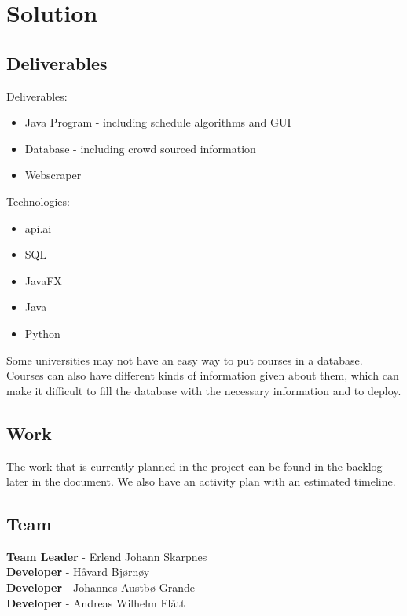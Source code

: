 \documentclass[pdftex, 12pt, norsk, a4paper, twoside]{article}
\numberwithin{equation}{section}
\numberwithin{figure}{section}
\numberwithin{table}{section}
\begin{document}
\newpage
\hfill
\hfill

\section{Solution}

\subsection{Deliverables}

Deliverables:
\begin{itemize}
    \item Java Program - including schedule algorithms and GUI
    \item Database - including crowd sourced information
    \item Webscraper
\end{itemize}
Technologies:
\begin{itemize}
    \item api.ai
    \item SQL
    \item JavaFX
    \item Java
    \item Python
\end{itemize}
Some universities may not have an easy way to put courses in a database. Courses can also have different kinds of information given about them, which can make it difficult to fill the database with the necessary information and to deploy. 

\subsection{Work}

The work that is currently planned in the project can be found in the backlog later in the document. We also have an activity plan with an estimated timeline.

\newpage
\hfill
\hfill

\subsection{Team}

\textbf{Team Leader} - Erlend Johann Skarpnes\\
\textbf{Developer} - Håvard Bjørnøy\\
\textbf{Developer} - Johannes Austbø Grande\\
\textbf{Developer} - Andreas Wilhelm Flått\\
\end{document}
